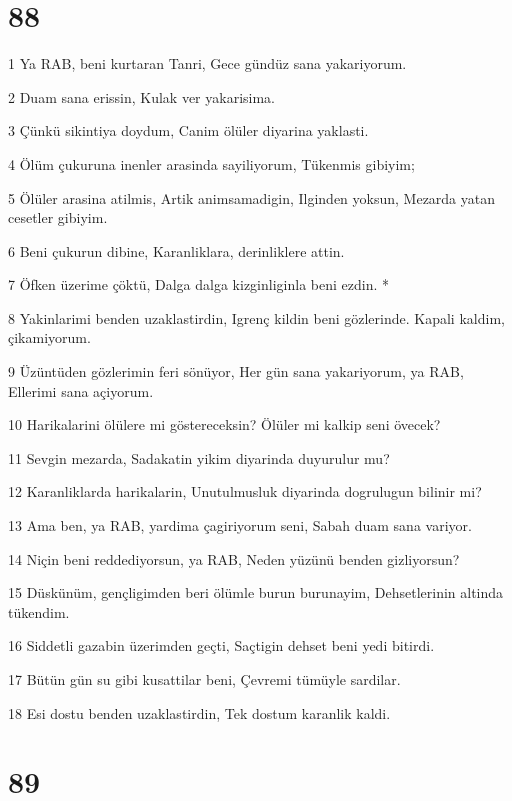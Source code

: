 \chapter{88}

\par 1 Ya RAB, beni kurtaran Tanri, Gece gündüz sana yakariyorum.
\par 2 Duam sana erissin, Kulak ver yakarisima.
\par 3 Çünkü sikintiya doydum, Canim ölüler diyarina yaklasti.
\par 4 Ölüm çukuruna inenler arasinda sayiliyorum, Tükenmis gibiyim;
\par 5 Ölüler arasina atilmis, Artik animsamadigin, Ilginden yoksun, Mezarda yatan cesetler gibiyim.
\par 6 Beni çukurun dibine, Karanliklara, derinliklere attin.
\par 7 Öfken üzerime çöktü, Dalga dalga kizginliginla beni ezdin. *
\par 8 Yakinlarimi benden uzaklastirdin, Igrenç kildin beni gözlerinde. Kapali kaldim, çikamiyorum.
\par 9 Üzüntüden gözlerimin feri sönüyor, Her gün sana yakariyorum, ya RAB, Ellerimi sana açiyorum.
\par 10 Harikalarini ölülere mi göstereceksin? Ölüler mi kalkip seni övecek?
\par 11 Sevgin mezarda, Sadakatin yikim diyarinda duyurulur mu?
\par 12 Karanliklarda harikalarin, Unutulmusluk diyarinda dogrulugun bilinir mi?
\par 13 Ama ben, ya RAB, yardima çagiriyorum seni, Sabah duam sana variyor.
\par 14 Niçin beni reddediyorsun, ya RAB, Neden yüzünü benden gizliyorsun?
\par 15 Düskünüm, gençligimden beri ölümle burun burunayim, Dehsetlerinin altinda tükendim.
\par 16 Siddetli gazabin üzerimden geçti, Saçtigin dehset beni yedi bitirdi.
\par 17 Bütün gün su gibi kusattilar beni, Çevremi tümüyle sardilar.
\par 18 Esi dostu benden uzaklastirdin, Tek dostum karanlik kaldi.

\chapter{89}

